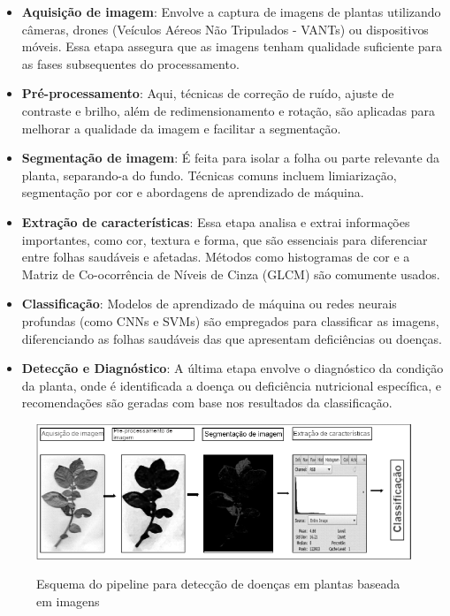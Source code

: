 \begin{itemize} 
    \item \textbf{Aquisição de imagem}: Envolve a captura de imagens de plantas utilizando câmeras, drones (Veículos Aéreos Não Tripulados - VANTs) ou dispositivos móveis. Essa etapa assegura que as imagens tenham qualidade suficiente para as fases subsequentes do processamento.
    \item \textbf{Pré-processamento}: Aqui, técnicas de correção de ruído, ajuste de contraste e brilho, além de redimensionamento e rotação, são aplicadas para melhorar a qualidade da imagem e facilitar a segmentação. 
    \item \textbf{Segmentação de imagem}: É feita para isolar a folha ou parte relevante da planta, separando-a do fundo. Técnicas comuns incluem limiarização, segmentação por cor e abordagens de aprendizado de máquina. \item \textbf{Extração de características}: Essa etapa analisa e extrai informações importantes, como cor, textura e forma, que são essenciais para diferenciar entre folhas saudáveis e afetadas. Métodos como histogramas de cor e a Matriz de Co-ocorrência de Níveis de Cinza (GLCM) são comumente usados. 
    \item \textbf{Classificação}: Modelos de aprendizado de máquina ou redes neurais profundas (como CNNs e SVMs) são empregados para classificar as imagens, diferenciando as folhas saudáveis das que apresentam deficiências ou doenças. 
    \item \textbf{Detecção e Diagnóstico}: A última etapa envolve o diagnóstico da condição da planta, onde é identificada a doença ou deficiência nutricional específica, e recomendações são geradas com base nos resultados da classificação.
\end{itemize}

\begin{figure}[H]
    \centering
    \caption{Esquema do pipeline para detecção de doenças em plantas baseada em imagens}
    \includegraphics[width=0.8\linewidth]{Illustrations/pipeline.png}
    \label{fig:pipeline}
    \end{figure}


